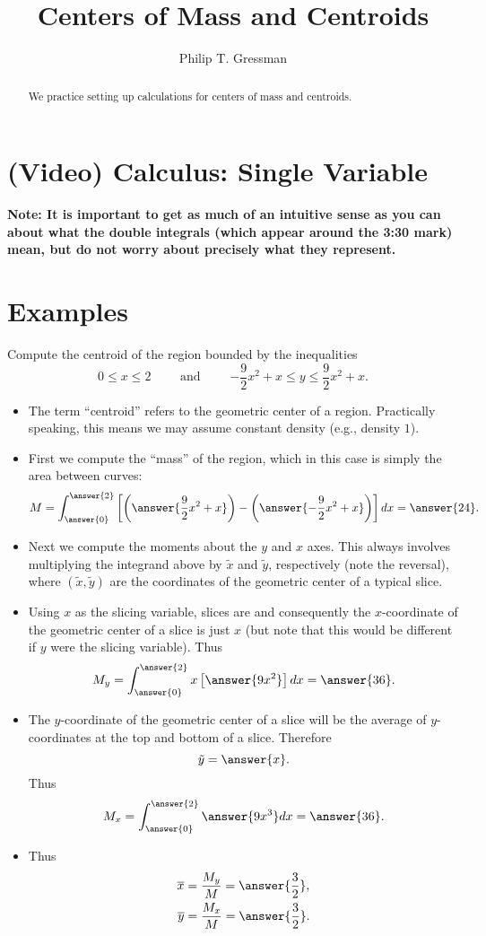 \documentclass{ximera}
\title{Centers of Mass and Centroids}
\author{Philip T. Gressman}
\begin{document}
\begin{abstract}
We practice setting up calculations for centers of mass and centroids.
\end{abstract}
\maketitle

\section*{(Video) Calculus: Single Variable}
\textbf{Note: It is important to get as much of an intuitive sense as you can about what the double integrals (which appear around the 3:30 mark) mean, but do not worry about precisely what they represent.}

\section*{Examples}

\begin{example}%
Compute the centroid of the region bounded by the inequalities $$0 \leq x \leq 2 \qquad \mbox{ and } \qquad {-\frac{9}{2}x^2+x} \leq y \leq {\frac{9}{2}x^2+x}.$$
\begin{itemize}
\item The term ``centroid'' refers to the geometric center of a region. Practically speaking, this means we may assume constant density (e.g., density $1$).
\item First we compute the ``mass'' of the region, which in this case is simply the area between curves:
\[ M = \int_{\answer{0}}^{\answer{2}} \left[ \left(\answer{\frac{9}{2}x^2+x}\right) - \left(\answer{-\frac{9}{2}x^2+x}\right) \right] dx  = \answer{24}. \]
\item Next we compute the moments about the $y$ and $x$ axes. This always involves multiplying the integrand above by $\tilde x$ and $\tilde y$, respectively (note the reversal), where $(\tilde x,\tilde y)$ are the coordinates of the geometric center of a typical slice.
\item Using $x$ as the slicing variable, slices are  and consequently the $x$-coordinate of the geometric center of a slice is just $x$ (but note that this would be different if $y$ were the slicing variable).  Thus
\[ M_y= \int_{\answer{0}}^{\answer{2}} x \left[ \answer{9 x^2} \right] dx = \answer{36}. \]
\item The $y$-coordinate of the geometric center of a slice will be the average of $y$-coordinates at the top and bottom of a slice. Therefore
\[ \tilde y = \answer{x}. \]
Thus
\[ M_x = \int_{\answer{0}}^{\answer{2}}  \answer{9x^3}  dx = \answer{36}. \]
\item Thus
\[ \begin{aligned}
 \overline{x} &  = \frac{M_y}{M} = \answer{\frac{3}{2}}, \\
 \overline{y} &  = \frac{M_x}{M} = \answer{\frac{3}{2}}.
 \end{aligned} \]
 \end{itemize}
\end{example}
\end{document}
